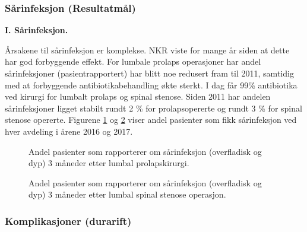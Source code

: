 \documentclass [norsk,a4paper,twoside]{article}\usepackage[]{graphicx}\usepackage[]{color}
\begin{document}
\subsubsection{Sårinfeksjon (Resultatmål)}




\textbf{I. Sårinfeksjon.}

Årsakene til sårinfeksjon er komplekse. NKR viste for mange år siden at dette har god forbyggende effekt. For lumbale prolaps operasjoner har
andel sårinfeksjoner (pasientrapportert) har blitt noe redusert fram til 2011, samtidig med at forbyggende antibiotikabehandling økte sterkt. I dag får 99\% antibiotika ved kirurgi for lumbalt prolaps og spinal stenose. Siden 2011 har andelen sårinfeksjoner ligget stabilt rundt 2 \% for prolapsopererte og rundt 3 \% for spinal stenose opererte.
Figurene \ref{fig:KpInfAvdPro} og \ref{fig:KpInfAvdSS} viser andel pasienter som fikk sårinfeksjon ved hver avdeling i årene 2016 og 2017.

      





\begin{figure}[ht]
\caption{\label{fig:KpInfAvdPro} Andel pasienter som rapporterer om sårinfeksjon 
      (overfladisk og dyp) 3 måneder etter lumbal prolapskirurgi.}
\end{figure}

\begin{figure}[ht]
\caption{\label{fig:KpInfAvdSS} Andel pasienter som rapporterer om sårinfeksjon 
      (overfladisk og dyp) 3 måneder etter lumbal spinal stenose operasjon.}
\end{figure}

\clearpage

\subsubsection{Komplikasjoner (durarift)}
\end{document}
